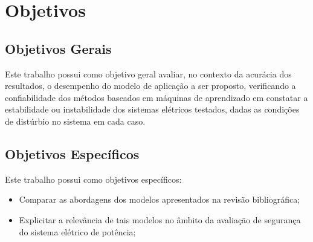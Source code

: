 \documentclass[12pt,oneside,a4paper,chapter=TITLE,section=TITLE,sumario=tradicional,english,brazil]{abntex2}
\begin{document}
	\section{Objetivos}
		\subsection{Objetivos Gerais}
		Este trabalho possui como objetivo geral avaliar, no contexto da acurácia dos resultados, o desempenho do modelo de aplicação a ser proposto, verificando a confiabilidade dos métodos baseados em máquinas de aprendizado em constatar a estabilidade ou instabilidade dos sistemas elétricos testados, dadas as condições de distúrbio no sistema em cada caso.
		\subsection{Objetivos Específicos}
		Este trabalho possui como objetivos específicos:
		\begin{itemize}
		\item Comparar as abordagens dos modelos apresentados na revisão bibliográfica;
		\item Explicitar a relevância de tais modelos no âmbito da avaliação de segurança do sistema elétrico de potência;
		\end{itemize}
\end{document}
